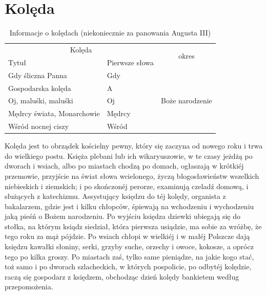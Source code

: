 \documentclass{book}
\begin{document}
\section{Kolęda}

\begin{table}[t]
    \caption[Kolędy]{
        Informacje o kolędach (niekoniecznie za panowania Augusta III)
    }
    \centering
    \begin{tabular}{||l|l|c||}
        \hline\hline
        \multicolumn{2}{||c|}{Kolęda} & \multirow{2}{*}{okres}  \\ \cline{1-2}
        Tytuł & Pierwsze słowa & \\ \hline
        Gdy śliczna Panna & Gdy & \multirow{5}{*}{Boże narodzenie} \\
        Gospodarska kolęda & A & \\
        Oj, maluśki, maluśki & Oj &  \\
        Mędrcy świata, Monarchowie & Mędrcy & \\
        Wśród nocnej ciszy & Wśród & \\
        \hline\hline
    \end{tabular}
\end{table}

Kolęda jest to obrządek kościelny pewny, który się zaczyna od nowego roku i trwa do wielkiego postu. Księża plebani lub ich wikaryuszowie, w te czasy jeżdżą po dworach i wsiach, albo po miastach chodzą po domach, ogłaszają w krótkiéj przemowie, przyjście na świat słowa wcielonego, życzą błogosławieństw wszelkich niebieskich i ziemskich; i po skończonéj perorze, examinują czeladź domową, i służących z katechizmu. Assystujący księdzu do téj kolędy, organista z bakalarzem, gdzie jest i kilku chłopców, śpiewają na wchodzeniu i wychodzeniu jaką pieśń o Bożem narodzeniu. Po wyjściu księdza dziewki ubiegają się do stołka, na którym ksiądz siedział, która pierwsza usiądzie, ma sobie za wróżbę, że tego roku za mąż pójdzie. Po wsiach chłopi w wielkiéj i w małéj Polszcze dają księdzu kawałki słoniny, serki, grzyby suche, orzechy i owoce, kokosze, a oprócz tego po kilka groszy. Po miastach zaś, tylko same pieniądze, na jakie kogo stać, toż samo i po dworach szlacheckich, w których pospolicie, po odbytéj kolędzie, raczą się gospodarz z księdzem, obchodząc dzień kolędy bankietem według przepomożenia.
\end{document}
